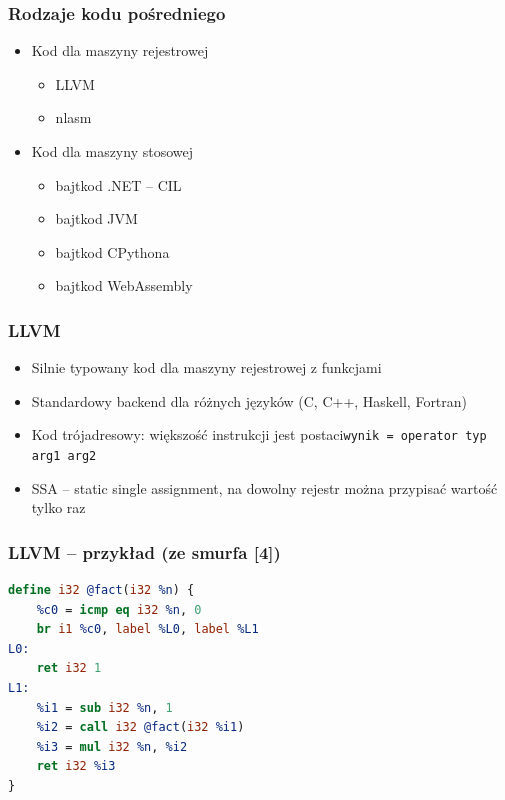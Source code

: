 \documentclass{beamer}
\begin{document}
	\begin{frame}
		\frametitle{Rodzaje kodu pośredniego}
		\begin{itemize}
			\item Kod dla maszyny rejestrowej
				\begin{itemize}
					\item LLVM
					\item nlasm
				\end{itemize}
			\item Kod dla maszyny stosowej
				\begin{itemize}
					\item bajtkod .NET -- CIL
					\item bajtkod JVM
					\item bajtkod CPythona
					\item bajtkod WebAssembly
				\end{itemize}
		\end{itemize}
	\end{frame}
	
	\begin{frame}
		\frametitle{LLVM}
		\begin{itemize}
			\item Silnie typowany kod dla maszyny rejestrowej z funkcjami
			\item Standardowy backend dla różnych języków (C, C++, Haskell, Fortran)
			\item Kod trójadresowy: większość instrukcji jest postaci\newline\texttt{wynik = operator typ arg1 arg2}
			\item SSA -- static single assignment, na dowolny rejestr można przypisać wartość tylko raz
		\end{itemize}
	\end{frame}

	\begin{frame}[fragile]
		\frametitle{LLVM -- przykład (ze smurfa [4])}
		\begin{lstlisting}[language=llvm]
define i32 @fact(i32 %n) {
	%c0 = icmp eq i32 %n, 0
	br i1 %c0, label %L0, label %L1
L0:
	ret i32 1
L1:
	%i1 = sub i32 %n, 1
	%i2 = call i32 @fact(i32 %i1)
	%i3 = mul i32 %n, %i2
	ret i32 %i3 
}
		\end{lstlisting}
	\end{frame}
	
\end{document}
